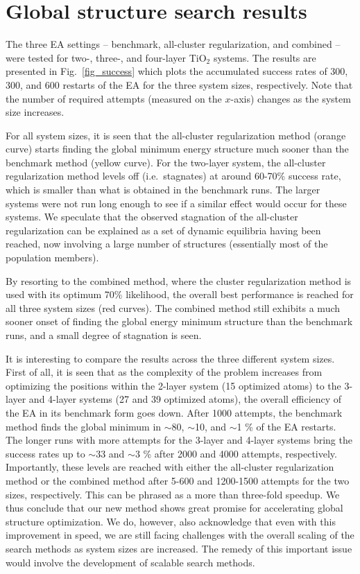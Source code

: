 \documentclass[aip,amsmath,amssymb,reprint]{revtex4-1}
\begin{document}
\section{Global structure search results}


The three EA settings -- benchmark, all-cluster regularization, and
combined -- were tested for two-, three-, and four-layer TiO$_2$
systems. The results are presented in Fig.\  \ref{fig_success} which
plots the accumulated success rates of 300, 300, and 600 restarts of the EA for the three system sizes, respectively. Note that
the number of required attempts (measured on the $x$-axis) changes as
the system size increases.

For all system sizes, it is seen that the all-cluster regularization
method (orange curve) starts finding the global minimum energy
structure much sooner than the benchmark method (yellow curve). For the two-layer system,
the all-cluster regularization method levels off (i.e.\ stagnates) at around 60-70\%
success rate, which is smaller than what is obtained in the benchmark
runs. The larger systems were not run long enough to see if a similar
effect would occur for these systems. We speculate that the observed
stagnation of the all-cluster regularization can be explained as a set
of dynamic equilibria having been reached, now involving a large
number of structures (essentially most of the population members).

By resorting to the combined method, where the cluster regularization
method is used with its optimum 70\% likelihood, the overall best
performance is reached for all three system sizes (red curves). The
combined method still exhibits a much sooner onset of finding the global energy
minimum structure than the benchmark runs, and a small degree of stagnation is seen.

It is interesting to compare the results across the three different
system sizes.  First of all, it is seen that as the complexity of the
problem increases from optimizing the positions within the 2-layer
system (15 optimized atoms) to the 3-layer and 4-layer systems (27 and
39 optimized atoms), the overall efficiency of the EA in its benchmark
form goes down. After 1000 attempts, the benchmark method finds the
global minimum in $\sim$80, $\sim$10, and $\sim$1 \% of the EA restarts. The
longer runs with more attempts for the 3-layer and 4-layer systems
bring the success rates up to $\sim$33 and $\sim$3 \% after 2000 and 4000
attempts, respectively. Importantly, these levels are reached with
either the all-cluster regularization method or the combined method
after 5-600 and 1200-1500 attempts for the two sizes,
respectively. This can be phrased as a more than three-fold
speedup. We thus conclude that our new method shows great promise for
accelerating global structure optimization. We do, however, also
acknowledge that even with this improvement in speed, we are still
facing challenges with the overall scaling of the search methods as
system sizes are increased. The remedy of this important issue would
involve the development of scalable search methods.
\end{document}

